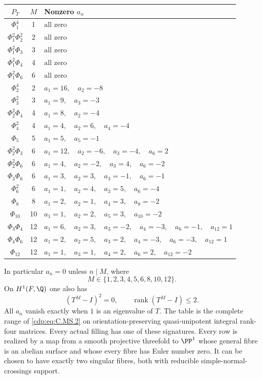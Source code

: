 \begin{proposition}
\begin{center}
\small
\begin{tabular}{ccl}
$P_T$ & $M$ & Nonzero $a_n$\\\hline
$\Phi_{1}^{4}$ & 1 & $\text{all zero}$ \\
$\Phi_{1}^{2}\Phi_{2}^{2}$ & 2 & $\text{all zero}$ \\
$\Phi_{1}^{2}\Phi_{3}$ & 3 & $\text{all zero}$ \\
$\Phi_{1}^{2}\Phi_{4}$ & 4 & $\text{all zero}$ \\
$\Phi_{1}^{2}\Phi_{6}$ & 6 & $\text{all zero}$ \\
$\Phi_{2}^{4}$ & 2 & $a_{1}=16,\quad a_{2}=-8$ \\
$\Phi_{3}^{2}$ & 3 & $a_{1}=9,\quad a_{3}=-3$ \\
$\Phi_{2}^{2}\Phi_{4}$ & 4 & $a_{1}=8,\quad a_{2}=-4$ \\
$\Phi_{4}^{2}$ & 4 & $a_{1}=4,\quad a_{2}=6,\quad a_{4}=-4$ \\
$\Phi_{5}$ & 5 & $a_{1}=5,\quad a_{5}=-1$ \\
$\Phi_{2}^{2}\Phi_{3}$ & 6 & $a_{1}=12,\quad a_{2}=-6,\quad a_{3}=-4,\quad a_{6}=2$ \\
$\Phi_{2}^{2}\Phi_{6}$ & 6 & $a_{1}=4,\quad a_{2}=-2,\quad a_{3}=4,\quad a_{6}=-2$ \\
$\Phi_{3}\Phi_{6}$ & 6 & $a_{1}=3,\quad a_{2}=3,\quad a_{3}=-1,\quad a_{6}=-1$ \\
$\Phi_{6}^{2}$ & 6 & $a_{1}=1,\quad a_{2}=4,\quad a_{3}=5,\quad a_{6}=-4$ \\
$\Phi_{8}$ & 8 & $a_{1}=2,\quad a_{2}=1,\quad a_{4}=3,\quad a_{8}=-2$ \\
$\Phi_{10}$ & 10 & $a_{1}=1,\quad a_{2}=2,\quad a_{5}=3,\quad a_{10}=-2$ \\
$\Phi_{3}\Phi_{4}$ & 12 & $a_{1}=6,\quad a_{2}=3,\quad a_{3}=-2,\quad a_{4}=-3,\quad a_{6}=-1,\quad a_{12}=1$ \\
$\Phi_{4}\Phi_{6}$ & 12 & $a_{1}=2,\quad a_{2}=5,\quad a_{3}=2,\quad a_{4}=-3,\quad a_{6}=-3,\quad a_{12}=1$ \\
$\Phi_{12}$ & 12 & $a_{1}=1,\quad a_{3}=1,\quad a_{4}=2,\quad a_{6}=2,\quad a_{12}=-2$ \\
\end{tabular}
\end{center}


In particular $a_n=0$ unless $n\mid M$, where
\[
                 M\in\{1,2,3,4,5,6,8,10,12\}.
 \tag{C.MS.3}\label{cdp:eq:C.MS.3}
\]
On $H^1(F,\Q)$ one also has
\[
                  (T^M-I)^2=0,
                  \qquad\operatorname{rank}(T^M-I)\le2.
 \tag{C.MS.10}\label{cdp:eq:C.MS.10}
\]
All $a_n$ vanish exactly when $1$ is an eigenvalue
of $T$. The table is the complete range of \eqref{cdp:eq:C.MS.2}
on orientation-preserving quasi-unipotent integral
rank-four matrices. Every actual filling has one
of these signatures. Every row is realized by a
map from a smooth projective threefold to $\PP^1$
whose general fibre is an abelian surface and
whose every fibre has Euler number zero. It
can be chosen to have exactly two singular
fibres, both with reducible simple-normal-crossings
support.


\end{proposition}
